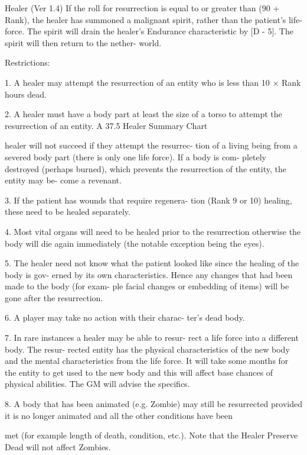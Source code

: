 \begin{Chapter}{Healer (Ver 1.4)}
If the roll for resurrection is equal to or greater than 
(90 + Rank), the healer has summoned a malignant 
spirit, rather than the patient’s life-force. The spirit 
will  drain the healer’s  Endurance  characteristic  by 
[D  -  5].  The  spirit  will  then  return  to  the  nether-
world. 

Restrictions: 

1.  A  healer  may  attempt  the  resurrection  of  an 
entity who is less than 10 × Rank hours dead. 

2. A healer must have a body part at least the size 
of a torso to attempt the resurrection of an entity. A 
37.5 Healer Summary Chart 

healer will not succeed if they attempt the resurrec-
tion  of  a  living  being  from  a  severed  body  part 
(there  is  only  one  life  force).  If  a  body  is  com-
pletely destroyed (perhaps burned), which prevents 
the  resurrection  of  the  entity,  the  entity  may  be-
come a revenant. 

3.  If  the  patient  has  wounds that  require  regenera-
tion (Rank 9 or 10) healing, these need to be healed 
separately. 

4. Most vital organs will need to be healed prior to 
the  resurrection  otherwise  the  body  will  die  again 
immediately  (the  notable  exception  being  the 
eyes). 

5.  The  healer  need  not  know  what  the  patient 
looked  like  since  the  healing  of  the  body  is  gov-
erned  by  its  own  characteristics.  Hence  any 
changes that had been made to the body (for exam-
ple  facial  changes  or  embedding  of  items)  will  be 
gone after the resurrection. 

6.  A  player  may  take  no  action  with  their  charac-
ter’s dead body. 

7.  In  rare  instances  a  healer  may  be  able  to  resur-
rect  a  life  force  into  a  different  body.  The  resur-
rected entity has the physical characteristics of the 
new  body  and  the  mental  characteristics  from  the 
life force. It will take some months for the entity to 
get  used  to  the  new  body  and  this  will  affect  base 
chances  of  physical  abilities.  The  GM  will  advise 
the specifics. 

8.  A  body  that  has  been  animated  (e.g.  Zombie) 
may  still  be  resurrected  provided  it  is  no  longer 
animated  and  all  the  other  conditions  have  been 

met  (for  example  length  of  death,  condition,  etc.). 
Note that the Healer Preserve Dead will not affect 
Zombies. 


\end{Chapter}

